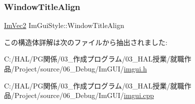 \subsubsection{\texorpdfstring{Window\+Title\+Align}{WindowTitleAlign}}
{\footnotesize\ttfamily \mbox{\hyperlink{struct_im_vec2}{Im\+Vec2}} Im\+Gui\+Style\+::\+Window\+Title\+Align}



この構造体詳解は次のファイルから抽出されました\+:\begin{DoxyCompactItemize}
\item 
C\+:/\+H\+A\+L/\+P\+G関係/03\+\_\+作成プログラム/03\+\_\+\+H\+A\+L授業/就職作品/\+Project/source/06\+\_\+\+Debug/\+Im\+G\+U\+I/\mbox{\hyperlink{imgui_8h}{imgui.\+h}}\item 
C\+:/\+H\+A\+L/\+P\+G関係/03\+\_\+作成プログラム/03\+\_\+\+H\+A\+L授業/就職作品/\+Project/source/06\+\_\+\+Debug/\+Im\+G\+U\+I/\mbox{\hyperlink{imgui_8cpp}{imgui.\+cpp}}\end{DoxyCompactItemize}
